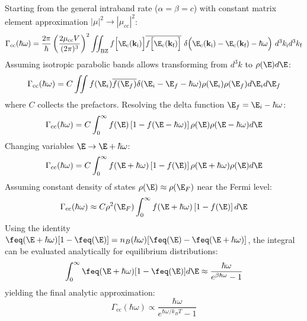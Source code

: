 Starting from the general intraband rate ($\alpha=\beta=c$) with constant matrix element approximation $|\mu|^{2} \to |\mu_{cc}|^{2}$:
\begin{equation}
    \Gamma_{\text{cc}}(\hbar\omega) = \frac{2\pi}{\hbar}\left( \frac{2\mu_{\text{cc}}V}{(2\pi)^{3}} \right)^{2} \iint_{\text{BZ}} f\Big[\E_{\text{c}}(\mathbf{k}_{\text{i}})  \Big]\overline{f\Big[\E_{\text{c}}(\mathbf{k}_{\text{f}})  \Big]} \ \delta \Big( \E_{\text{c}}(\mathbf{k}_{\text{i}}) - \E_{\text{c}}(\mathbf{k}_{\text{f}}) - \hbar\omega \Big) \ d^{3}k_{\text{i}}d^{3}k_{\text{f}}
\end{equation}
Assuming isotropic parabolic bands allows transforming from $d^{3}k$ to $\rho(\E)d\E$:
\begin{equation}
    \Gamma_{\text{cc}}(\hbar\omega) = C \iint f(\E_{i})\overline{f(\E_{f})} \delta(\E_{i} - \E_{f} - \hbar\omega) \rho(\E_{i})\rho(\E_{f}) d\E_{i} d\E_{f}
\end{equation}
where $C$ collects the prefactors. Resolving the delta function $\E_{f} = \E_{i} - \hbar\omega$:
\begin{equation}
    \Gamma_{\text{cc}}(\hbar\omega) = C \int_{0}^{\infty} f(\E)\left[1 - f(\E-\hbar\omega)\right] \rho(\E)\rho(\E-\hbar\omega) d\E
\end{equation}
Changing variables $\E \to \E + \hbar\omega$:
\begin{equation}
    \Gamma_{\text{cc}}(\hbar\omega) = C \int_{0}^{\infty} f(\E+\hbar\omega)\left[1 - f(\E)\right] \rho(\E+\hbar\omega)\rho(\E) d\E
\end{equation}
Assuming constant density of states $\rho(\E) \approx \rho(\E_{F})$ near the Fermi level:
\begin{equation}
    \Gamma_{\text{cc}}(\hbar\omega) \approx C \rho^{2}(\E_{F}) \int_{0}^{\infty} f(\E+\hbar\omega)\left[1 - f(\E)\right] d\E
\end{equation}
Using the identity $\feq(\E+\hbar\omega)[1-\feq(\E)] = n_{B}(\hbar\omega) [\feq(\E) - \feq(\E+\hbar\omega)]$, the integral can be evaluated analytically for equilibrium distributions:
\begin{equation}
    \int_{0}^{\infty} \feq(\E+\hbar\omega)[1-\feq(\E)] d\E \approx \frac{\hbar\omega}{e^{\beta\hbar\omega}-1}
\end{equation}
yielding the final analytic approximation:
\begin{equation}
    \Gamma_{\text{cc}}(\hbar\omega) \propto \frac{\hbar\omega}{e^{\hbar\omega/k_{B}T}-1}
\end{equation}

